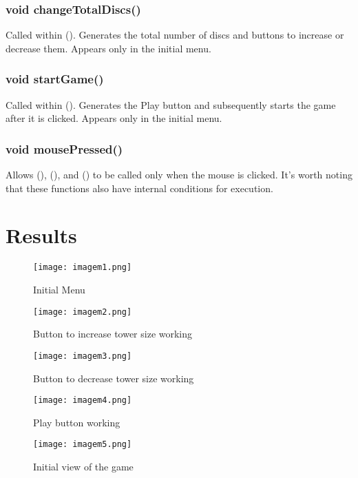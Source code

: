 \documentclass[
	12pt,				%
	oneside,			%
	a4paper,			%
	english,			%
	brazil,				%
	]{abntex2}
\begin{document}
{\subsubsection{void changeTotalDiscs()}
Called within \mousePressed(). Generates the total number of discs and buttons to increase or decrease them. Appears only in the initial menu.

\subsubsection{void startGame()}
Called within \mousePressed(). Generates the Play button and subsequently starts the game after it is clicked. Appears only in the initial menu.

\subsubsection{void mousePressed()}
Allows \moveDiscs(), \changeTotalDiscs(), and \startGame() to be called only when the mouse is clicked. It's worth noting that these functions also have internal conditions for execution.

\section{Results}

\begin{figure}[H]
  \centering
  \texttt{[image: imagem1.png]}
  \caption{Initial Menu}
\end{figure}

\begin{figure}[H]
  \centering
  \texttt{[image: imagem2.png]}
  \caption{Button to increase tower size working}
\end{figure}

\begin{figure}[H]
  \centering
  \texttt{[image: imagem3.png]}
  \caption{Button to decrease tower size working}
\end{figure}

\begin{figure}[H]
  \centering
  \texttt{[image: imagem4.png]}
  \caption{Play button working}
\end{figure}

\begin{figure}[H]
  \centering
  \texttt{[image: imagem5.png]}
  \caption{Initial view of the game}
\end{figure}

}
\end{document}
